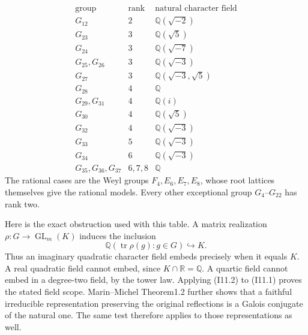 \[
\begin{array}{c|c|c}
 \text{group}&\text{rank}&\text{natural character field}\\ \hline
 G_{12}&2&\mathbb Q(\sqrt{-2})\\
 G_{23}&3&\mathbb Q(\sqrt5)\\
 G_{24}&3&\mathbb Q(\sqrt{-7})\\
 G_{25},G_{26}&3&\mathbb Q(\sqrt{-3})\\
 G_{27}&3&\mathbb Q(\sqrt{-3},\sqrt5)\\
 G_{28}&4&\mathbb Q\\
 G_{29},G_{31}&4&\mathbb Q(i)\\
 G_{30}&4&\mathbb Q(\sqrt5)\\
 G_{32}&4&\mathbb Q(\sqrt{-3})\\
 G_{33}&5&\mathbb Q(\sqrt{-3})\\
 G_{34}&6&\mathbb Q(\sqrt{-3})\\
 G_{35},G_{36},G_{37}&6,7,8&\mathbb Q
\end{array}                                                   \tag{I11.1}
\]
The rational cases are the Weyl groups $F_4,E_6,E_7,E_8$,
whose root lattices themselves give the rational models.
Every other exceptional group $G_4$--$G_{22}$ has rank two.

Here is the exact obstruction used with this table. A matrix
realization $\rho:G\to\operatorname{GL}_m(K)$ induces the inclusion
\[
 \mathbb Q(\operatorname{tr}\rho(g):g\in G)\hookrightarrow K.
                                                               \tag{I11.2}
\]
Thus an imaginary quadratic character field embeds precisely when
it equals $K$. A real quadratic field cannot embed, since
$K\cap\mathbb R=\mathbb Q$. A quartic field cannot embed in a
degree-two field, by the tower law. Applying (I11.2) to (I11.1)
proves the stated field scope. Marin--Michel Theorem1.2 further
shows that a faithful irreducible representation preserving the
original reflections is a Galois conjugate of the natural one.
The same test therefore applies to those representations as well.

